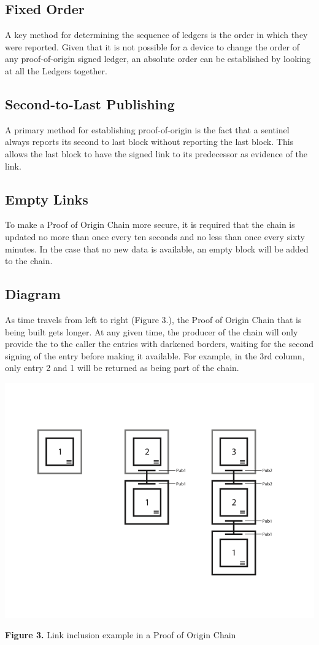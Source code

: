 \documentclass{article}
\begin{document}
\subsection {Fixed Order}
A key method for determining the sequence of ledgers is the order in which they were reported. Given that it is not possible for a device to change the order of any \Gls{proof-of-origin} signed ledger, an absolute order can be established by looking at all the Ledgers together.

\subsection {Second-to-Last Publishing}
A primary method for establishing \Gls{proof-of-origin} is the fact that a \Gls{sentinel} always reports its second to last block without reporting the last block. This allows the last block to have the signed link to its predecessor as evidence of the link.

\subsection {Empty Links}
To make a Proof of Origin Chain more secure, it is required that the chain is updated no more than once every ten seconds and no less than once every sixty minutes. In the case that no new data is available, an empty block will be added to the chain.

\subsection {Diagram}
As time travels from left to right (Figure 3.), the Proof of Origin Chain that is being built gets longer. At any given time, the producer of the chain will only provide the to the caller the entries with darkened borders, waiting for the second signing of the entry before making it available. For example, in the 3rd column, only entry 2 and 1 will be returned as being part of the chain.

\includegraphics[width=\textwidth] {proofoforigin}
\begin{center}\textbf{Figure 3.}  Link inclusion example in a Proof of Origin Chain
\end{center}
\end{document}
